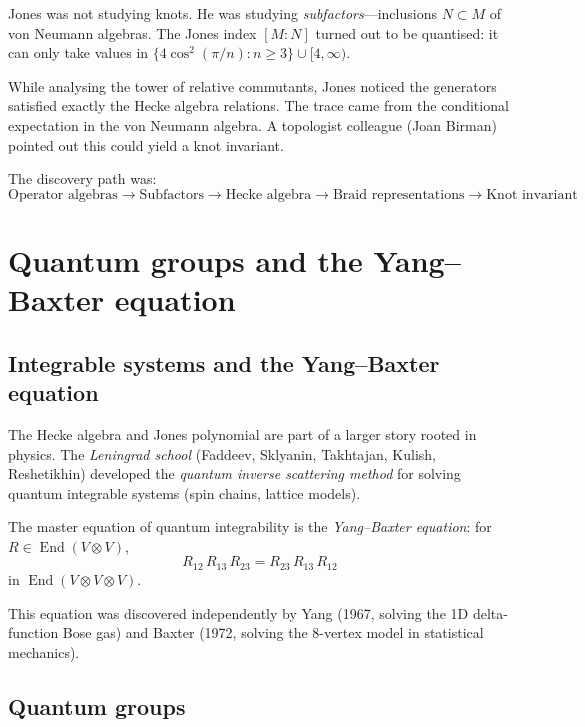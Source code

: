\documentclass[12pt]{article}
\DeclareMathOperator{\End}{End}
\begin{document}
Jones was not studying knots. He was studying \emph{subfactors}---inclusions
$N \subset M$ of von Neumann algebras. The Jones index $[M:N]$ turned out
to be quantised: it can only take values in
$\{4\cos^2(\pi/n) : n \ge 3\} \cup [4, \infty)$.

While analysing the tower of relative commutants, Jones noticed the
generators satisfied exactly the Hecke algebra relations. The trace came
from the conditional expectation in the von Neumann algebra. A topologist
colleague (Joan Birman) pointed out this could yield a knot invariant.

The discovery path was:
\[
  \text{Operator algebras} \to \text{Subfactors} \to \text{Hecke algebra}
  \to \text{Braid representations} \to \text{Knot invariant}
\]

\section{Quantum groups and the Yang--Baxter equation}

\subsection{Integrable systems and the Yang--Baxter equation}

The Hecke algebra and Jones polynomial are part of a larger story rooted
in physics. The \emph{Leningrad school} (Faddeev, Sklyanin, Takhtajan,
Kulish, Reshetikhin) developed the \emph{quantum inverse scattering method}
for solving quantum integrable systems (spin chains, lattice models).

The master equation of quantum integrability is the
\emph{Yang--Baxter equation}: for $R \in \End(V \otimes V)$,
\begin{equation} \label{eq:ybe}
  R_{12}\, R_{13}\, R_{23} = R_{23}\, R_{13}\, R_{12}
\end{equation}
in $\End(V \otimes V \otimes V)$.

This equation was discovered independently by Yang (1967, solving the
1D delta-function Bose gas) and Baxter (1972, solving the 8-vertex model
in statistical mechanics).

\subsection{Quantum groups}
\end{document}
